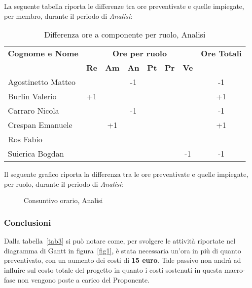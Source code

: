 \noindent La seguente tabella riporta le differenze tra ore preventivate e quelle impiegate, per membro, durante il periodo di \textit{Analisi}: 
\begin{table}[h]
\centering
\begin{tabular}{|l|c|c|c|c|c|c|c|}
	\toprule
	\textbf{Cognome e Nome} & \multicolumn{6}{c}{\textbf{Ore per ruolo}} & \textbf{Ore Totali} \\
	& \textbf{Re} & \textbf{Am} & \textbf{An} & \textbf{Pt} & \textbf{Pr} & \textbf{Ve} & \\
		
	\midrule
	Agostinetto Matteo & & & -1 & & & & -1 \\
	Burlin Valerio & +1 & & & & & & +1 \\ 
	Carraro Nicola & & & -1 & & & & -1 \\
	Crespan Emanuele & & +1 & & & & & +1 \\
	Ros Fabio & & & & & & & \\
	Suierica Bogdan & & & & & & -1 & -1 \\
		
	\bottomrule
\end{tabular}
\caption{Differenza ore a componente per ruolo, Analisi}
\end{table}

\newpage
\noindent Il seguente grafico riporta la differenza tra le ore preventivate e quelle impiegate, per ruolo, durante il periodo di \textit{Analisi}:
\begin{figure}[h]
\centering
{}
\caption{Consuntivo orario, Analisi}
\end{figure}

\subsubsection{Conclusioni}
Dalla tabella~\ref{tab3} si può notare come, per svolgere le attività riportate nel diagramma di \gls{Gantt} in figura~\ref{fig1}, è stata necessaria un'ora in più di quanto preventivato, con un aumento dei costi di \textbf{15 euro}. Tale passivo non andrà ad influire sul costo totale del progetto in quanto i costi sostenuti in questa macro-fase non vengono poste a carico del Proponente.  


